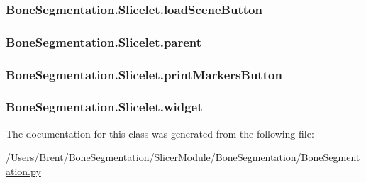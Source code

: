 \subsubsection[{load\+Scene\+Button}]{\setlength{\rightskip}{0pt plus 5cm}Bone\+Segmentation.\+Slicelet.\+load\+Scene\+Button}\label{class_bone_segmentation_1_1_slicelet_ad6a6e46817322b3e798bd1f0bf4e1517}
\hypertarget{class_bone_segmentation_1_1_slicelet_aca71eb02d750fd28af4b5c154ff243af}{}
\subsubsection[{parent}]{\setlength{\rightskip}{0pt plus 5cm}Bone\+Segmentation.\+Slicelet.\+parent}\label{class_bone_segmentation_1_1_slicelet_aca71eb02d750fd28af4b5c154ff243af}
\hypertarget{class_bone_segmentation_1_1_slicelet_aa21581cbef1468a9b9227cde81133580}{}
\subsubsection[{print\+Markers\+Button}]{\setlength{\rightskip}{0pt plus 5cm}Bone\+Segmentation.\+Slicelet.\+print\+Markers\+Button}\label{class_bone_segmentation_1_1_slicelet_aa21581cbef1468a9b9227cde81133580}
\hypertarget{class_bone_segmentation_1_1_slicelet_ae7ccf3cfd1b74f947d130b1cf5441411}{}
\subsubsection[{widget}]{\setlength{\rightskip}{0pt plus 5cm}Bone\+Segmentation.\+Slicelet.\+widget}\label{class_bone_segmentation_1_1_slicelet_ae7ccf3cfd1b74f947d130b1cf5441411}


The documentation for this class was generated from the following file\+:\begin{DoxyCompactItemize}
\item 
/\+Users/\+Brent/\+Bone\+Segmentation/\+Slicer\+Module/\+Bone\+Segmentation/\hyperlink{_bone_segmentation_8py}{Bone\+Segmentation.\+py}\end{DoxyCompactItemize}
